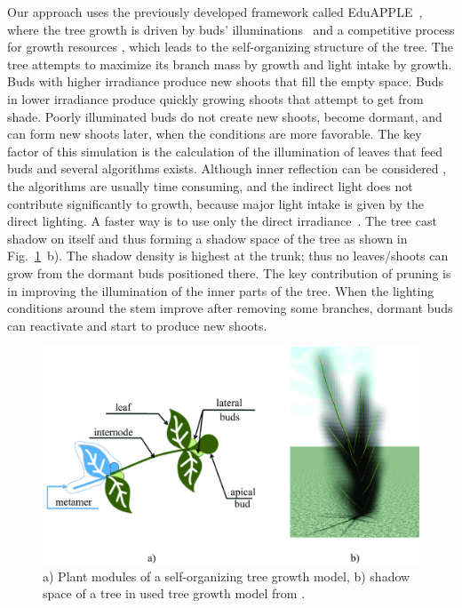 \documentclass[1p]{elsarticle}
\begin{document}
Our approach uses the previously developed framework called EduAPPLE~\cite{kohek_eduapple:_2015}, 
where the tree growth is driven by buds' illuminations~\cite{benes_efficient_1996,benes_visual_1997,mech_visual_1996} and a competitive process for growth resources \cite{alsweis_modeling_2005,arvo_modeling_1988,palubicki_self-organizing_2009,runions_modeling_2007}, which leads to the self-organizing structure of the tree. The
tree attempts to maximize its branch mass by growth and light intake by
growth. Buds with higher irradiance produce new shoots that fill the
empty space. Buds in lower irradiance produce quickly growing shoots
that attempt to get from shade. Poorly illuminated buds do not create
new shoots, become dormant, and can form new shoots later, when the
conditions are more favorable. The key factor of this simulation is the
calculation of the illumination of leaves that feed buds and several
algorithms exists. Although inner reflection can be considered \cite{soler_efficient_2003},
the algorithms are usually time consuming, and the indirect light does
not contribute significantly to growth, because major light intake is
given by the direct lighting. A faster way is to use only the direct
irradiance~\cite{benes_visual_1997,benes_efficient_1996,mech_visual_1996,pirk_plastic_2012}. 
The tree cast shadow on itself and thus
forming a shadow space of the tree as shown in Fig.~\ref{fig:my_figure1}~b). The shadow
density is highest at the trunk; thus no leaves/shoots can grow from the
dormant buds positioned there. The key contribution of pruning is in
improving the illumination of the inner parts of the tree. When the
lighting conditions around the stem improve after removing some
branches, dormant buds can reactivate and start to produce new shoots.
\begin{figure}[hbt]
    \centering
    \includegraphics[width=4.5in]{figs/image1.jpg}
    \caption{a) Plant modules of a self-organizing tree growth
model, b) shadow space of a tree in used tree growth model from \cite{kohek_eduapple:_2015}.}
    \label{fig:my_figure1}
\end{figure}
\end{document}
